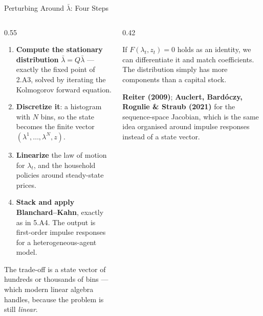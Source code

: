\begin{frame}{Perturbing Around $\bar{\lambda}$: Four Steps}
\begin{columns}[T]
\begin{column}{0.55\textwidth}
\small
\begin{enumerate}\small\setlength{\itemsep}{1mm}
  \item \textbf{Compute the stationary distribution} $\bar{\lambda}=Q\bar{\lambda}$ --- exactly the fixed point of 2.A3, solved by iterating the Kolmogorov forward equation.
  \item \textbf{Discretize it}: a histogram with $N$ bins, so the state becomes the finite vector $(\lambda^1,\dots,\lambda^N,z)$.
  \item \textbf{Linearize} the law of motion for $\lambda_t$, and the household policies around steady-state prices.
  \item \textbf{Stack and apply Blanchard--Kahn}, exactly as in 5.A4. The output is first-order impulse responses for a heterogeneous-agent model.
\end{enumerate}
\medskip
The trade-off is a state vector of hundreds or thousands of bins --- which modern linear algebra handles, because the problem is still \emph{linear}.
\end{column}
\begin{column}{0.42\textwidth}
\begin{conceptbox}[title=\textbf{Why it works}]\small
If $F(\lambda_t,z_t)=0$ holds as an identity, we can differentiate it and match coefficients. The distribution simply has more components than a capital stock.
\end{conceptbox}
\medskip
\begin{examplebox}\footnotesize
\textbf{Reiter (2009)}; \textbf{Auclert, Bard\'oczy, Rognlie \& Straub (2021)} for the sequence-space Jacobian, which is the same idea organised around impulse responses instead of a state vector.
\end{examplebox}
\end{column}
\end{columns}
\vspace{1mm}
\end{frame}

